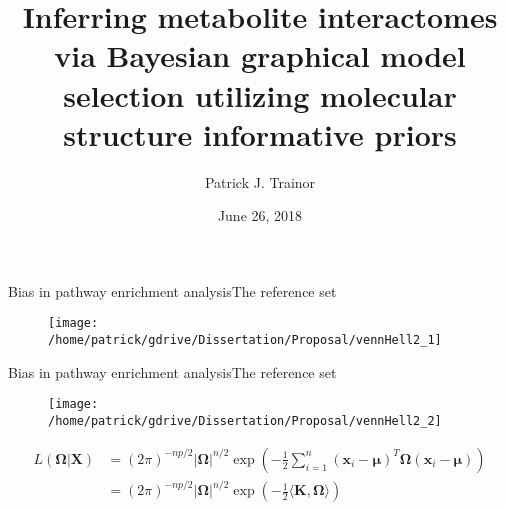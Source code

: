 \documentclass[xcolor=dvipsnames]{beamer}
\begin{document}
	
\title[Bayesian Interactome Modeling]{Inferring metabolite interactomes via Bayesian graphical model selection utilizing molecular structure informative priors}
\author[P.J. Trainor]{Patrick J. Trainor}
\date[June 2018]{June 26, 2018}

\begin{frame}
	\titlepage
\end{frame}

\begin{frame}{Bias in pathway enrichment analysis}{The reference set}
	\vspace{-15.5pt}
	\begin{figure}
		\texttt{[image: /home/patrick/gdrive/Dissertation/Proposal/vennHell2\_1]}
	\end{figure}
\end{frame}

\begin{frame}{Bias in pathway enrichment analysis}{The reference set}
	\vspace{-15.5pt}
	\begin{figure}
		\texttt{[image: /home/patrick/gdrive/Dissertation/Proposal/vennHell2\_2]}
	\end{figure}
\end{frame}

\begin{frame}
	\begin{align}
	L(\boldsymbol{\Omega}|\textbf{X})&=(2 \pi)^{-np/2}|\boldsymbol{\Omega}|^{n/2} \exp \left(-\frac{1}{2}\sum_{i=1}^{n} (\textbf{x}_i-\boldsymbol{\mu})^T \boldsymbol{\Omega} (\textbf{x}_i-\boldsymbol{\mu})\right) \\
	&=(2 \pi)^{-np/2}|\boldsymbol{\Omega}|^{n/2} \exp \left(-\frac{1}{2} \langle \textbf{K}, \boldsymbol{\Omega}\rangle\right)
	\end{align}
\end{frame}
\end{document}
